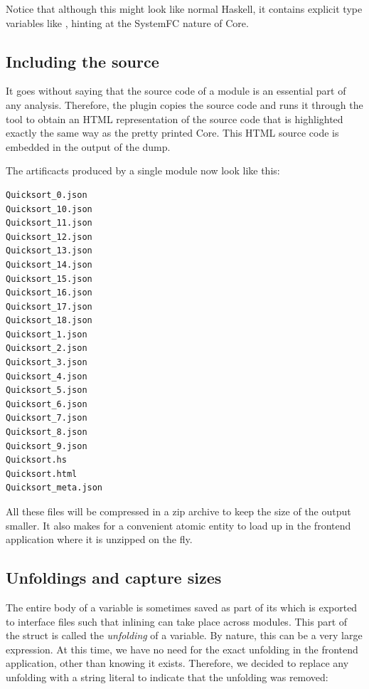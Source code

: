 Notice that although this might look like normal Haskell, it contains explicit type variables like
, hinting at the SystemFC nature of Core.

\subsection{Including the source}
It goes without saying that the source code of a module is an essential part of any analysis. Therefore,
the plugin copies the source code and runs it through the  \cite{pygments} tool to obtain
an HTML representation of the source code that is highlighted exactly the same way as the pretty printed Core.
This HTML source code is embedded in the output of the dump.

The artificacts produced by a single module now look like this:

\begin{listing}[H]
\begin{verbatim}
Quicksort_0.json
Quicksort_10.json
Quicksort_11.json
Quicksort_12.json
Quicksort_13.json
Quicksort_14.json
Quicksort_15.json
Quicksort_16.json
Quicksort_17.json
Quicksort_18.json
Quicksort_1.json
Quicksort_2.json
Quicksort_3.json
Quicksort_4.json
Quicksort_5.json
Quicksort_6.json
Quicksort_7.json
Quicksort_8.json
Quicksort_9.json
Quicksort.hs
Quicksort.html
Quicksort_meta.json
\end{verbatim}
\end{listing}

All these files will be compressed in a zip archive to keep the size of the output smaller. It also makes for
a convenient atomic entity to load up in the frontend application where it is unzipped on the fly.

\subsection{Unfoldings and capture sizes}

The entire body of a variable is sometimes saved as part of its  which is exported to interface
files such that inlining can take place across modules. This part of the  struct is called the
\textit{unfolding} of a variable. By nature, this can be a very large expression. At this time, we have no
need for the exact unfolding in the frontend application, other than knowing it exists. Therefore, we decided 
to replace any unfolding with a string literal to indicate that the unfolding was removed:

